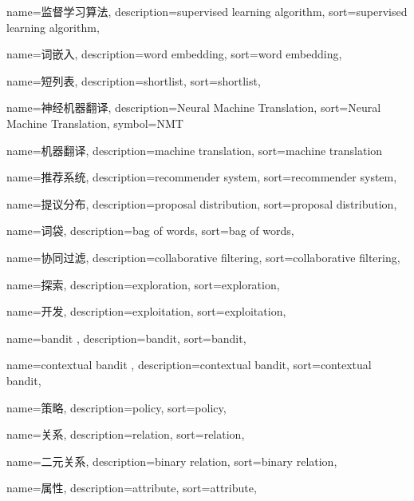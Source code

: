 {
  name=监督学习算法,
  description={supervised learning algorithm},
  sort={supervised learning algorithm},
}

{
  name=词嵌入,
  description={word embedding},
  sort={word embedding},
}

{
  name=短列表,
  description={shortlist},
  sort={shortlist},
}

{
  name=神经机器翻译,
  description={Neural Machine Translation},
  sort={Neural Machine Translation},
  symbol={NMT}
}

{
  name=机器翻译,
  description={machine translation},
  sort={machine translation}
}

{
  name=推荐系统,
  description={recommender system},
  sort={recommender system},
}

{
  name=提议分布,
  description={proposal distribution},
  sort={proposal distribution},
}

{
  name=词袋,
  description={bag of words},
  sort={bag of words},
}

{
  name=协同过滤,
  description={collaborative filtering},
  sort={collaborative filtering},
}

{
  name=探索,
  description={exploration},
  sort={exploration},
}

{
  name=开发,
  description={exploitation},
  sort={exploitation},
}

{
  name=bandit ,
  description={bandit},
  sort={bandit},
}

{
  name=contextual bandit ,
  description={contextual bandit},
  sort={contextual bandit},
}

{
  name=策略,
  description={policy},
  sort={policy},
}

{
  name=关系,
  description={relation},
  sort={relation},
}

{
  name=二元关系,
  description={binary relation},
  sort={binary relation},
}

{
  name=属性,
  description={attribute},
  sort={attribute},
}

